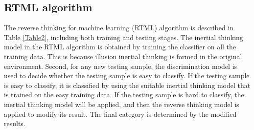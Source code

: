 \subsection{RTML algorithm}
The reverse thinking for machine learning (RTML) algorithm is described in Table \ref{Table2}, including both training and testing stages. The inertial thinking model in the RTML algorithm is obtained by training the classifier on all the training data. This is because illusion inertial thinking is formed in the original environment. Second, for any new testing sample, the discrimination model is used to decide whether the testing sample is easy to classify. If the testing sample is easy to classify, it is classified by using the suitable inertial thinking model that is trained on the easy training data. If the testing sample is hard to classify, the inertial thinking model will be applied, and then the reverse thinking model is applied to modify its result. The final category is determined by the modified results.

